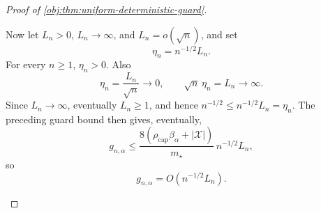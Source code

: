 \documentclass[11pt]{article}
\begin{document}
\begin{proof}[Proof of \cref{obj:thm:uniform-deterministic-guard}]
\begin{enumerate}
Now let \(L_n>0\), \(L_n\to\infty\), and \(L_n=o(\sqrt n)\), and set
\[
\eta_n=n^{-1/2}L_n .
\]
For every \(n\ge1\), \(\eta_n>0\).  Also
\[
\eta_n=\frac{L_n}{\sqrt n}\longrightarrow0,
\qquad
\sqrt n\,\eta_n=L_n\longrightarrow\infty .
\]
Since \(L_n\to\infty\), eventually \(L_n\ge1\), and hence
\(n^{-1/2}\le n^{-1/2}L_n=\eta_n\).  The preceding guard bound then gives,
eventually,
\[
g_{n,\alpha}
\le
\frac{8(\rho_{\mathrm{cap}}\beta_\alpha+|\mathcal X|)}{m_\star}
\,n^{-1/2}L_n,
\]
so
\[
g_{n,\alpha}=O(n^{-1/2}L_n).
\]
\end{enumerate}
\end{proof}




\end{document}
